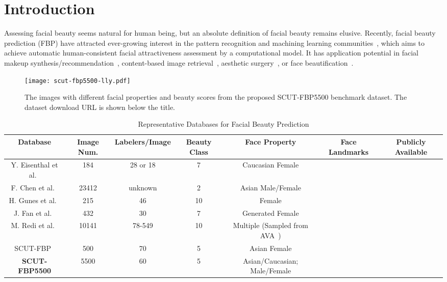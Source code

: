 \documentclass[10pt,conference,a4paper]{IEEEtran}
\begin{document}
\section{Introduction}
Assessing facial beauty seems natural for human being, but an absolute definition of facial beauty remains elusive. Recently, facial beauty prediction (FBP) have attracted ever-growing interest in the pattern recognition and machining learning communities~\cite{2011survey,zhang2016computer,laurentini2014computer}, which aims to achieve automatic human-consistent facial attractiveness assessment by a computational model. It has application potential in facial makeup synthesis/recommendation~\cite{zhang2016computer,2015liu,2011eg}, content-based image retrieval~\cite{2012ava}, aesthetic surgery~\cite{zhang2016computer}, or face beautification~\cite{2017liang,2015deep,2014liang,2008sig}.


\begin{figure}[!t]
\centering
\texttt{[image: scut-fbp5500-lly.pdf]}
\caption{The images with different facial properties and beauty scores from the proposed SCUT-FBP5500 benchmark dataset. The dataset download URL is shown below the title.}
\label{fig_scutfbp5500}
\end{figure}

\begin{table*}
\renewcommand{\arraystretch}{1.3}
\caption{Representative Databases for Facial Beauty Prediction}
\begin{center}
\label{table_1}
\begin{tabular}{|c||c|c|c|c|c|c|}
\hline
Database & Image Num.  & Labelers/Image& Beauty Class & Face Property & Face Landmarks & Publicly Available\\ \hline
\hline
Y. Eisenthal et al.~\cite{2006nc_Dror} & 184 & 28 or 18 & 7 & Caucasian Female&  & \\
\hline
F. Chen et al.~\cite{4} & 23412 & unknown & 2 & Asian Male/Female&  &  \\
\hline
H. Gunes et al.~\cite{17} & 215 & 46 & 10 & Female &   &  \\
\hline
J. Fan et al.~\cite{2012fan} & 432 & 30 & 7 & Generated Female&  &  \\
\hline
M. Redi et al.~\cite{14} & 10141 & 78-549 & 10 & Multiple (Sampled from AVA~\cite{2012ava}) &  &  \\\hline
SCUT-FBP~\cite{2015xie} & 500 & 70 & 5 & Asian Female&  &  \\
\hline
\textbf{SCUT-FBP5500} & 5500 & 60 & 5 & Asian/Caucasian; Male/Female&  &  \\
\hline
\end{tabular}
\end{center}
\end{table*}
\end{document}
